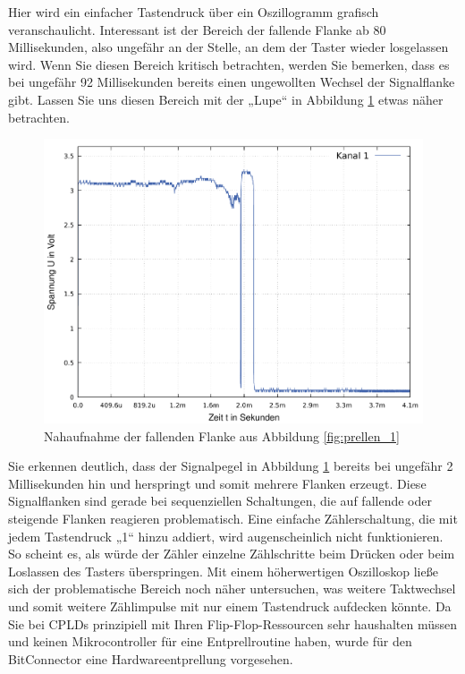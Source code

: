 \documentclass{article}
\begin{document}
Hier wird ein einfacher Tastendruck über ein Oszillogramm grafisch veranschaulicht. Interessant ist der Bereich der fallende Flanke ab 80 Millisekunden, also ungefähr an der Stelle, an dem der Taster wieder losgelassen wird. Wenn Sie diesen Bereich kritisch betrachten, werden Sie bemerken, dass es bei ungefähr 92 Millisekunden bereits einen ungewollten Wechsel der Signalflanke gibt. Lassen Sie uns diesen Bereich mit der „Lupe“ in Abbildung \ref{fig:prellen_2} etwas näher betrachten.

\begin{figure}[!h]
	\centering
	\includegraphics[width=0.92\linewidth]{Figures/bounce_near}
	\caption{Nahaufnahme der fallenden Flanke aus Abbildung \ref{fig:prellen_1}}
	\label{fig:prellen_2}
\end{figure}

Sie erkennen deutlich, dass der Signalpegel in Abbildung \ref{fig:prellen_2} bereits bei ungefähr 2 Millisekunden hin und herspringt und somit mehrere Flanken erzeugt. Diese Signalflanken sind gerade bei sequenziellen Schaltungen, die auf fallende oder steigende Flanken reagieren problematisch. Eine einfache Zählerschaltung, die mit jedem Tastendruck „1“ hinzu addiert, wird augenscheinlich nicht funktionieren. So scheint es, als würde der Zähler einzelne Zählschritte beim Drücken oder beim Loslassen des Tasters überspringen. Mit einem höherwertigen Oszilloskop ließe sich der problematische Bereich noch näher untersuchen, was weitere Taktwechsel und somit weitere Zählimpulse mit nur einem Tastendruck aufdecken könnte. 
Da Sie bei CPLDs prinzipiell mit Ihren Flip-Flop-Ressourcen sehr haushalten müssen und keinen Mikrocontroller für eine Entprellroutine haben, wurde für den BitConnector eine Hardwareentprellung vorgesehen. 
\end{document}
